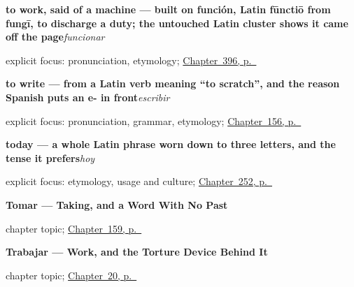 \noindent\begin{minipage}[t]{\linewidth}
\raggedright
\textbf{to work, said of a machine — built on función, Latin fūnctiō from fungī, to discharge a duty; the untouched Latin cluster shows it came off the page}\enspace\emph{funcionar}\par
\footnotesize explicit focus: pronunciation, etymology; \hyperref[ch:aprender-y-cocinar]{Chapter~396, p.~\pageref*{ch:aprender-y-cocinar}}
\end{minipage}\par\smallskip

\noindent\begin{minipage}[t]{\linewidth}
\raggedright
\textbf{to write — from a Latin verb meaning \textquotedblleft{}to scratch\textquotedblright{}, and the reason Spanish puts an e- in front}\enspace\emph{escribir}\par
\footnotesize explicit focus: pronunciation, grammar, etymology; \hyperref[ch:spanish-escribir]{Chapter~156, p.~\pageref*{ch:spanish-escribir}}
\end{minipage}\par\smallskip

\noindent\begin{minipage}[t]{\linewidth}
\raggedright
\textbf{today — a whole Latin phrase worn down to three letters, and the tense it prefers}\enspace\emph{hoy}\par
\footnotesize explicit focus: etymology, usage and culture; \hyperref[ch:ahora-hoy]{Chapter~252, p.~\pageref*{ch:ahora-hoy}}
\end{minipage}\par\smallskip

\noindent\begin{minipage}[t]{\linewidth}
\raggedright
\textbf{Tomar — Taking, and a Word With No Past}\par
\footnotesize chapter topic; \hyperref[ch:spanish-tomar]{Chapter~159, p.~\pageref*{ch:spanish-tomar}}
\end{minipage}\par\smallskip

\noindent\begin{minipage}[t]{\linewidth}
\raggedright
\textbf{Trabajar --- Work, and the Torture Device Behind It}\par
\footnotesize chapter topic; \hyperref[ch:spanish-trabajar]{Chapter~20, p.~\pageref*{ch:spanish-trabajar}}
\end{minipage}\par\smallskip

